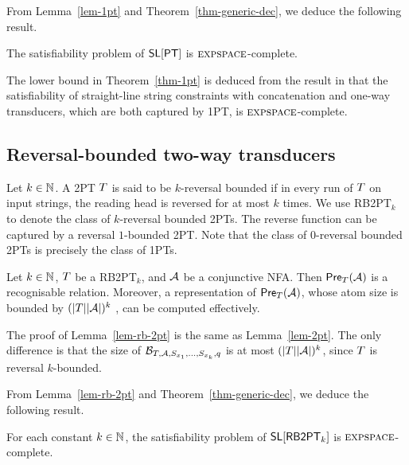 From Lemma~\ref{lem-1pt} and Theorem~\ref{thm-generic-dec}, we deduce the following result.
%
\begin{theorem} \label{thm-1pt}
The satisfiability problem of $\textsf{SL}[\textsf{PT}]$ is $\textsc{expspace}$-complete. 
\end{theorem}

The lower bound in Theorem~\ref{thm-1pt} is deduced from the result in \cite{LB16} that the satisfiability of straight-line string constraints with concatenation and one-way transducers, which are both captured by 1PT, is $\textsc{expspace}$-complete.

\subsection{Reversal-bounded two-way transducers}

Let $k \in \mathbb{N}$. A 2PT $T$ is said  to be $k$-reversal bounded if in every run of $T$ on input strings, the reading head is reversed for at most $k$ times. We use  RB2PT$_k$ to denote the class of $k$-reversal bounded 2PTs. The reverse function can be captured by a reversal $1$-bounded 2PT.
Note that the class of $0$-reversal bounded 2PTs is precisely the class of 1PTs.

\begin{lemma}\label{lem-rb-2pt}
Let $k \in \mathbb{N}$, $T$ be a RB2PT$_k$, and $\mathcal{A}$ be a conjunctive NFA. Then $\textsf{Pre}_{T}(\mathcal{A})$ is a recognisable relation. Moreover, a representation of $\textsf{Pre}_{T}(\mathcal{A})$, whose atom size is bounded by $(|T||\mathcal{A}|)^k$ , can be computed effectively.
\end{lemma}

The proof of Lemma~\ref{lem-rb-2pt} is the same as Lemma~\ref{lem-2pt}. The only difference is that the size of $\mathcal{B}_{T, \mathcal{A}, S_{x_1}, \ldots, S_{x_k}, q}$ is at most $(|T| |\mathcal{A}|)^k$, since $T$ is reversal $k$-bounded.

From Lemma~\ref{lem-rb-2pt} and Theorem~\ref{thm-generic-dec}, we deduce the following result.
%
\begin{theorem} \label{thm-rb-2pt}
For each constant $k \in \mathbb{N}$, the satisfiability problem of $\textsf{SL}[\textsf{RB2PT}_k]$ is $\textsc{expspace}$-complete. 
\end{theorem}

